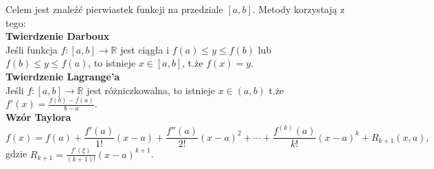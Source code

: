 Celem jest znaleźć pierwiastek funkcji na przedziale \( [a, b] \). Metody korzystają z tego: \\
\textbf{Twierdzenie Darboux} \\
Jeśli funkcja \( f: [a, b] \rightarrow \mathbb{R} \) jest ciągła i \( f(a) \leq y \leq f(b) \) lub \( f(b) \leq y \leq f(a) \), to istnieje \( x \in [a, b] \), t.że \( f(x) = y \). \\
\textbf{Twierdzenie Lagrange’a} \\
Jeśli \( f: [a, b] \rightarrow \mathbb{R} \) jest różniczkowalna, to istnieje \( x \in (a, b) \) t.że \( f'(x) = \frac{f(b) - f(a)}{b - a} \). \\
\textbf{Wzór Taylora}
\[
	f(x) = f(a) + \frac{f'(a)}{1!}(x - a) + \frac{f''(a)}{2!}(x - a)^2 + \cdots + \frac{f^{(k)}(a)}{k!}(x - a)^k + R_{k+1}(x, a),
\]
gdzie \( R_{k+1} = \frac{f'(\xi)}{(k+1)!}(x - a)^{k+1} \).